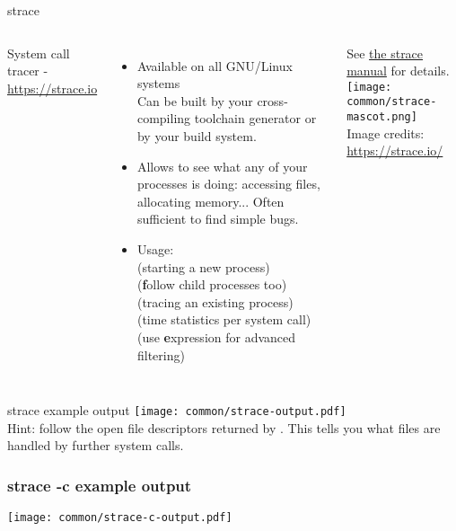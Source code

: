 \begin{frame}[fragile]{strace}
  \begin{columns}[T]
  \small
  System call tracer - \url{https://strace.io}
  \begin{itemize}
  \item Available on all GNU/Linux systems\\
        Can be built by your cross-compiling toolchain generator or by your build system.
  \item Allows to see what any of your processes is doing: accessing files, allocating memory...
        Often sufficient to find simple bugs.
  \item Usage:\\
     (starting a new process)\\
     ({\bf f}ollow child processes too)\\
     (tracing an existing process)\\
     (time statistics per system call)
     (use {\bf e}xpression for advanced filtering)
  \end{itemize}
  See \href{https://man7.org/linux/man-pages/man1/strace.1.html}{the strace manual} for details.
  \texttt{[image: common/strace-mascot.png]}\\
  \tiny Image credits: \url{https://strace.io/}
  \end{columns}
\end{frame}

\begin{frame}[fragile]{strace example output}
  \texttt{[image: common/strace-output.pdf]}\\
  Hint: follow the open file descriptors returned by .
  This tells you what files are handled by further system calls.
\end{frame}

\begin{frame}[fragile]
  \frametitle{strace -c example output}
  \texttt{[image: common/strace-c-output.pdf]}
\end{frame}
